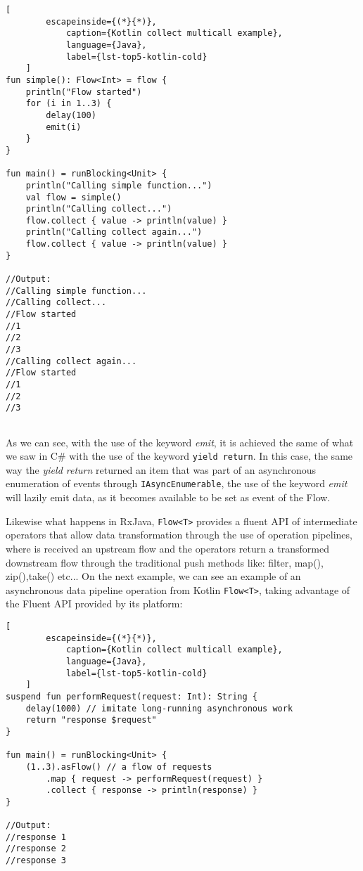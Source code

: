 \begin{center}
	\lstset{basicstyle=\scriptsize\ttfamily,frame=bottomline}
	\begin{lstlisting}[
		escapeinside={(*}{*)},
			caption={Kotlin collect multicall example},
			language={Java},
			label={lst-top5-kotlin-cold}
	]
fun simple(): Flow<Int> = flow { 
	println("Flow started")
	for (i in 1..3) {
		delay(100)
		emit(i)
	}
}

fun main() = runBlocking<Unit> {
	println("Calling simple function...")
	val flow = simple()
	println("Calling collect...")
	flow.collect { value -> println(value) } 
	println("Calling collect again...")
	flow.collect { value -> println(value) } 
}

//Output:
//Calling simple function...
//Calling collect...
//Flow started
//1
//2
//3
//Calling collect again...
//Flow started
//1
//2
//3
	
	\end{lstlisting}
\end{center}

As we can see, with the use of the keyword \textit{emit}, it is achieved the same of what we saw in C\# with the use of the keyword \texttt{yield return}.
In this case, the same way the \textit{yield return} returned an item that was part of an asynchronous enumeration of events through \texttt{IAsyncEnumerable}, the use of the keyword \textit{emit} will lazily emit data, as it becomes available to be set as event of the Flow.

Likewise what happens in RxJava, \texttt{Flow<T>} provides a fluent API of intermediate operators that allow data transformation through the use of operation pipelines, where is received an upstream  flow and the operators return a transformed downstream flow through the traditional push methods like: filter, map(), zip(),take() etc... 
On the next example, we can see an example of an asynchronous data pipeline operation from Kotlin \texttt{Flow<T>}, taking advantage of the Fluent API provided by its platform:

\begin{center}
	\lstset{basicstyle=\scriptsize\ttfamily,frame=bottomline}
	\begin{lstlisting}[
		escapeinside={(*}{*)},
			caption={Kotlin collect multicall example},
			language={Java},
			label={lst-top5-kotlin-cold}
	]
suspend fun performRequest(request: Int): String {
	delay(1000) // imitate long-running asynchronous work
	return "response $request"
}

fun main() = runBlocking<Unit> {
	(1..3).asFlow() // a flow of requests
		.map { request -> performRequest(request) }
		.collect { response -> println(response) }
}

//Output:
//response 1
//response 2
//response 3
	
	\end{lstlisting}
\end{center}


